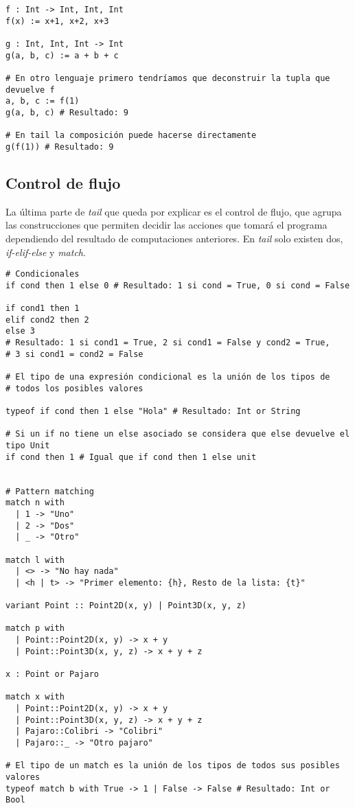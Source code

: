 \begin{lstlisting}[style=tail]
f : Int -> Int, Int, Int
f(x) := x+1, x+2, x+3

g : Int, Int, Int -> Int
g(a, b, c) := a + b + c

# En otro lenguaje primero tendríamos que deconstruir la tupla que devuelve f
a, b, c := f(1)
g(a, b, c) # Resultado: 9

# En tail la composición puede hacerse directamente
g(f(1)) # Resultado: 9
\end{lstlisting}

\subsection{Control de flujo}

La última parte de \textit{tail} que queda por explicar es el control de flujo, que agrupa las construcciones que permiten decidir las acciones que tomará el programa dependiendo del resultado de computaciones anteriores. En \textit{tail} solo existen dos, \textit{if-elif-else} y \textit{match}.


\begin{lstlisting}[style=tail, label={lst:control_flujo}, caption={Control de flujo}]
# Condicionales
if cond then 1 else 0 # Resultado: 1 si cond = True, 0 si cond = False

if cond1 then 1
elif cond2 then 2
else 3
# Resultado: 1 si cond1 = True, 2 si cond1 = False y cond2 = True,
# 3 si cond1 = cond2 = False

# El tipo de una expresión condicional es la unión de los tipos de
# todos los posibles valores

typeof if cond then 1 else "Hola" # Resultado: Int or String

# Si un if no tiene un else asociado se considera que else devuelve el tipo Unit
if cond then 1 # Igual que if cond then 1 else unit


# Pattern matching
match n with
  | 1 -> "Uno"
  | 2 -> "Dos"
  | _ -> "Otro"
  
match l with
  | <> -> "No hay nada"
  | <h | t> -> "Primer elemento: {h}, Resto de la lista: {t}"
  
variant Point :: Point2D(x, y) | Point3D(x, y, z)
  
match p with
  | Point::Point2D(x, y) -> x + y
  | Point::Point3D(x, y, z) -> x + y + z
  
x : Point or Pajaro

match x with
  | Point::Point2D(x, y) -> x + y
  | Point::Point3D(x, y, z) -> x + y + z
  | Pajaro::Colibri -> "Colibri"
  | Pajaro::_ -> "Otro pajaro"
  
# El tipo de un match es la unión de los tipos de todos sus posibles valores
typeof match b with True -> 1 | False -> False # Resultado: Int or Bool
\end{lstlisting}

